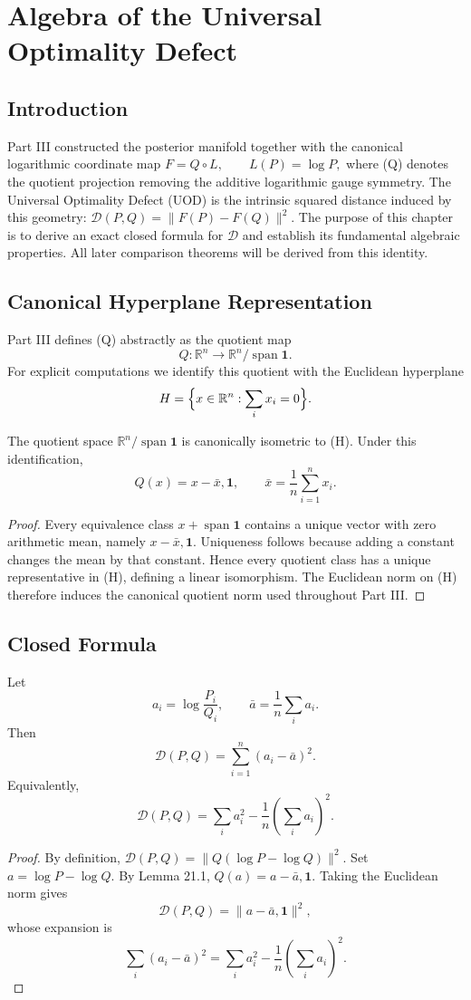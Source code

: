 \chapter[Algebra of the UOD]{Algebra of the Universal Optimality Defect}
\section{Introduction}
Part III constructed the posterior manifold together with the
canonical logarithmic coordinate map
$F = Q\circ L, \qquad L(P)=\log P,$
where (Q) denotes the quotient projection removing the additive
logarithmic gauge symmetry. The Universal Optimality Defect (UOD) is the
intrinsic squared distance induced by this geometry:
$\mathcal{D}(P,Q)=\|F(P)-F(Q)\|^{2}.$
The purpose of this chapter is to derive an exact closed formula for
\(\mathcal{D}\) and establish its fundamental algebraic properties.
All later comparison theorems will be derived from this identity.
\section{Canonical Hyperplane Representation}
Part III defines (Q) abstractly as the quotient map
\[ Q:\mathbb{R}^{n}\rightarrow
\mathbb{R}^{n}/\operatorname{span}{\mathbf1}. \]
For explicit computations we identify this quotient with the Euclidean
hyperplane
\[ H=\Bigl\{x\in\mathbb{R}^{n}:\sum_{i}
x_i=0\Bigr\}. \]
\begin{lemma}
\label{ch:lem:21-1}
The quotient space
\(\mathbb{R}^{n}/\operatorname{span}{\mathbf1}\) is
canonically isometric to (H). Under this identification,
\[ Q(x)=x-\bar x,\mathbf1, \qquad
\bar x=\frac1n\sum_{i=1}^{n} x_i. \]
\begin{proof}
Every equivalence class
\(x+\operatorname{span}{\mathbf1}\) contains a unique
vector with zero arithmetic mean, namely
\(x-\bar x,\mathbf1\). Uniqueness follows because adding a
constant changes the mean by that constant. Hence every quotient class
has a unique representative in (H), defining a linear isomorphism. The
Euclidean norm on (H) therefore induces the canonical quotient norm used
throughout Part III.
\end{proof}
\end{lemma}
\section{Closed Formula}
\begin{theorem}
\label{ch:thm:21-2}
Let
\[ a_i=\log\frac{P_i}{Q_i}, \qquad
\bar a=\frac1n\sum_{i} a_i. \]
Then
\[ \boxed{
\mathcal{D}(P,Q)
=
\sum_{i=1}^{n}(a_i-\bar a)^2.
} \]
Equivalently,
\[ \boxed{
\mathcal{D}(P,Q)
=
\sum_i a_i^2
-
\frac1n\left(\sum_i a_i\right)^2.
} \]
\begin{proof}
By definition,
$\mathcal{D}(P,Q) = \|Q(\log P-\log Q)\|^{2}.$
Set \(a=\log P-\log Q\). By Lemma 21.1,
$Q(a)=a-\bar a,\mathbf1.$
Taking the Euclidean norm gives
\[ \mathcal{D}(P,Q) = \|a-\bar a,\mathbf1\|^{2},
\]
whose expansion is
\[ \sum_{i}(a_i-\bar a)^{2} = \sum_{i}
a_i^{2}-\frac1n\left(\sum_{i}
a_i\right)^{2}. \]
\end{proof}
\end{theorem}
